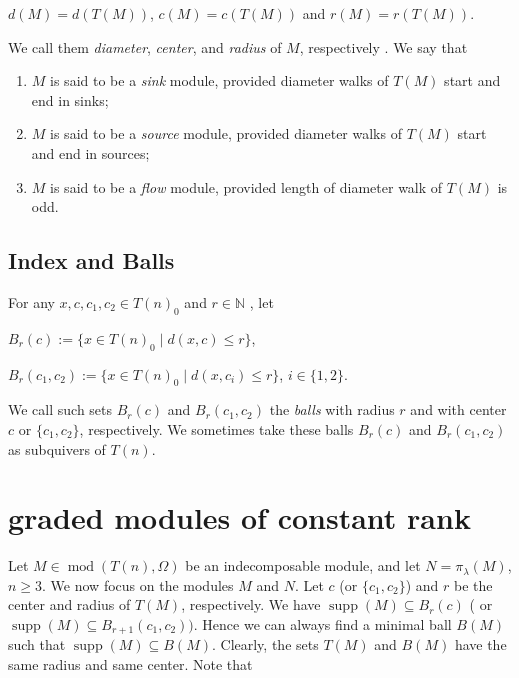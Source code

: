 \documentclass[a4paper,12pt]{amsart}
\DeclareMathOperator{\modd}{mod}
\DeclareMathOperator{\supp}{supp}
\begin{document}
\begin{center}
$d(M)=d(T(M))$,  $c(M)=c(T(M))$ and $r(M)=r(T(M))$. 
\end{center}
We call them   \textit{diameter}, \textit{center},  and  \textit{radius}  of $M$, respectively  \cite[2.4]{Claus}.  We say that 
\begin{enumerate}
\item  $M$ is said to be a \textit{sink}  module,        provided diameter walks of $T(M)$ start and end in sinks;

\item $M$ is said to be a  \textit{source} module,  provided diameter walks of $T(M)$ start and end in sources;

\item $M$ is said to be a \textit{flow} module,  provided length of diameter walk of $T(M)$ is odd.
 
\end{enumerate}







\subsection{Index and Balls}\label{Ball}

 
 For any $ x, c, c_1, c_2\in T(n)_0$ and $r\in \mathbb{N}$ \cite[2.3]{Claus}, let
\begin{center}
$B_r(c):=\{x\in T(n)_0 \mid d(x,c) \leq r\}$, 

$B_r(c_1,c_2):=\{x \in T(n)_0\mid d(x, c_i)\leq r\}$, $i\in \{1,2\}$.
\end{center}
We call such sets $B_r(c)$ and $B_r(c_1, c_2)$ the \textit{balls} with radius $r$ and with center $c$ or $\{c_1, c_2\}$, respectively. We sometimes take these balls $B_r(c)$ and $B_r(c_1, c_2)$ as subquivers of $T(n)$.


 
 
 \section{ graded modules of constant rank}\label{Matrice}

Let $M\in \modd(T(n),\Omega)$ be an  indecomposable module, and let  $N=\pi_\lambda(M)$, $n\geq 3$. We now focus on the modules $M$ and $N$.   Let  $c$ (or $\{c_1,c_2\}$) and $r$ be the center and radius of $T(M)$, respectively.     We have $\supp(M)\subseteq B_r(c)$ ( or $ \supp(M)\subseteq B_{r+1}(c_1,c_2))$. Hence we can always find a minimal ball $B(M)$ such that $\supp(M)\subseteq B(M)$. Clearly, the  sets $T(M)$ and $B(M)$ have the same radius and same center.    Note that
\end{document}
